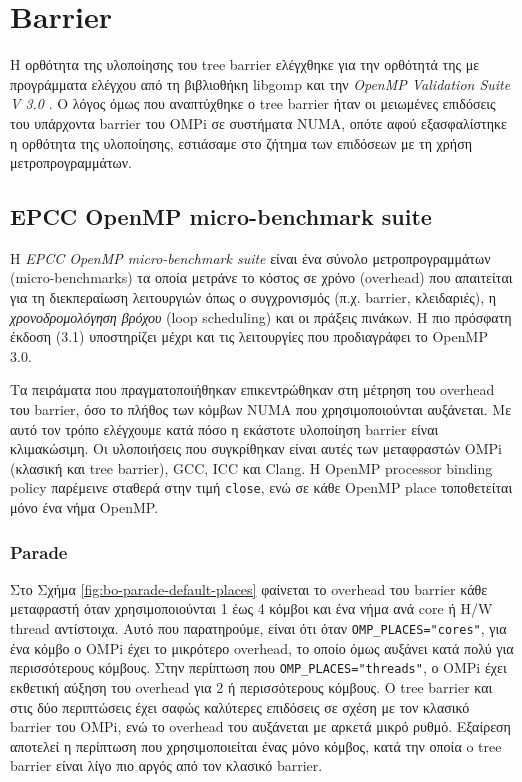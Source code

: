 \section{Barrier}
\label{sec:exp-barrier}
Η ορθότητα της υλοποίησης του tree barrier ελέγχθηκε για την ορθότητά της με προγράμματα ελέγχου από τη βιβλιοθήκη libgomp και την \textit{OpenMP Validation Suite V 3.0} \cite{wang2012openmp, ompvalsuite3}. Ο λόγος όμως που αναπτύχθηκε ο tree barrier ήταν οι μειωμένες επιδόσεις του υπάρχοντα barrier του OMPi σε συστήματα NUMA, οπότε αφού εξασφαλίστηκε η ορθότητα της υλοποίησης, εστιάσαμε στο ζήτημα των επιδόσεων με τη χρήση μετροπρογραμμάτων.

\subsection{EPCC OpenMP micro-benchmark suite}
Η \textit{EPCC OpenMP micro-benchmark suite} \cite{bull1999measuring} είναι ένα σύνολο μετροπρογραμμάτων (micro-benchmarks) τα οποία μετράνε το κόστος σε χρόνο (overhead) που απαιτείται για τη διεκπεραίωση λειτουργιών όπως ο συγχρονισμός (π.χ. barrier, κλειδαριές), η \textit{χρονοδρομολόγηση βρόχου} (loop scheduling) και οι πράξεις πινάκων. Η πιο πρόσφατη έκδοση (3.1) υποστηρίζει μέχρι και τις λειτουργίες που προδιαγράφει το OpenMP 3.0.

Τα πειράματα που πραγματοποιήθηκαν επικεντρώθηκαν στη μέτρηση του overhead του barrier, όσο το πλήθος των κόμβων NUMA που χρησιμοποιούνται αυξάνεται. Με αυτό τον τρόπο ελέγχουμε κατά πόσο η εκάστοτε υλοποίηση barrier είναι κλιμακώσιμη. Οι υλοποιήσεις που συγκρίθηκαν είναι αυτές των μεταφραστών OMPi (κλασική και tree barrier), GCC, ICC και Clang. Η OpenMP processor binding policy παρέμεινε σταθερά στην τιμή \texttt{close}, ενώ σε κάθε OpenMP place τοποθετείται μόνο ένα νήμα OpenMP.


\subsubsection{Parade}
Στο Σχήμα \ref{fig:bo-parade-default-places} φαίνεται το overhead του barrier κάθε μεταφραστή όταν χρησιμοποιούνται 1 έως 4 κόμβοι και ένα νήμα ανά core ή H/W thread αντίστοιχα. Αυτό που παρατηρούμε, είναι ότι όταν \texttt{OMP\_PLACES="cores"}, για ένα κόμβο ο OMPi έχει το μικρότερο overhead, το οποίο όμως αυξάνει κατά πολύ για περισσότερους κόμβους. Στην περίπτωση που \texttt{OMP\_PLACES="threads"}, ο OMPi έχει εκθετική αύξηση του overhead για 2 ή περισσότερους κόμβους. Ο tree barrier και στις δύο περιπτώσεις έχει σαφώς καλύτερες επιδόσεις σε σχέση με τον κλασικό barrier του OMPi, ενώ το overhead του αυξάνεται με αρκετά μικρό ρυθμό. Εξαίρεση αποτελεί η περίπτωση που χρησιμοποιείται ένας μόνο κόμβος, κατά την οποία o tree barrier είναι λίγο πιο αργός από τον κλασικό barrier. %

